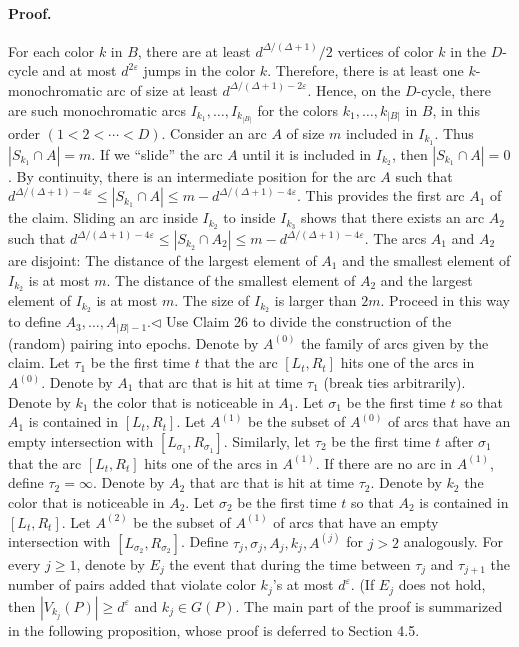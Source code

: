 \documentclass[10pt,a4paper]{article}
\begin{document}
\paragraph{Proof.} For each color $k$ in $B$, there are at least $d^{\Delta/(\Delta+1)}/2$ vertices of color $k$ in the $D$-cycle and at most $d^{2\varepsilon}$ jumps in the color $k$. Therefore, there is at least one $k$-monochromatic arc of size at least $d^{\Delta/(\Delta+1)-2\varepsilon}$. Hence, on the $D$-cycle, there are such monochromatic arcs $I_{k_1},\ldots,I_{k_{|B|}}$ for the colors $k_1,\ldots,k_{|B|}$ in $B$, in this order $(1<2<\cdots<D)$.
Consider an arc $A$ of size $m$ included in $I_{k_1}$. Thus $|S_{k_1}\cap A|=m$. If we ``slide'' the arc $A$ until it is included in $I_{k_2}$, then $|S_{k_1}\cap A|=0$. By continuity, there is an intermediate position for the arc $A$ such that $d^{\Delta/(\Delta+1)-4\varepsilon}\leq|S_{k_1}\cap A|\leq m-d^{\Delta/(\Delta+1)-4\varepsilon}$. This provides the first arc $A_1$ of the claim.
Sliding an arc inside $I_{k_2}$ to inside $I_{k_3}$ shows that there exists an arc $A_2$ such that $d^{\Delta/(\Delta+1)-4\varepsilon}\leq|S_{k_2}\cap A_2|\leq m-d^{\Delta/(\Delta+1)-4\varepsilon}$. The arcs $A_1$ and $A_2$ are disjoint: The distance of the largest element of $A_1$ and the smallest element of $I_{k_2}$ is at most $m$. The distance of the smallest element of $A_2$ and the largest element of $I_{k_2}$ is at most $m$. The size of $I_{k_2}$ is larger than $2m$. Proceed in this way to define $A_3,\ldots,A_{|B|-1}$.\hfill$\triangleleft$
Use Claim 26 to divide the construction of the (random) pairing into epochs. Denote by $A^{(0)}$ the family of arcs given by the claim. Let $\tau_1$ be the first time $t$ that the arc $[L_t,R_t]$ hits one of the arcs in $A^{(0)}$. Denote by $A_1$ that arc that is hit at time $\tau_1$ (break ties arbitrarily). Denote by $k_1$ the color that is noticeable in $A_1$. Let $\sigma_1$ be the first time $t$ so that $A_1$ is contained in $[L_t,R_t]$. Let $A^{(1)}$ be the subset of $A^{(0)}$ of arcs that have an empty intersection with $[L_{\sigma_1},R_{\sigma_1}]$. Similarly, let $\tau_2$ be the first time $t$ after $\sigma_1$ that the arc $[L_t,R_t]$ hits one of the arcs in $A^{(1)}$. If there are no arc in $A^{(1)}$, define $\tau_2=\infty$. Denote by $A_2$ that arc that is hit at time $\tau_2$. Denote by $k_2$ the color that is noticeable in $A_2$. Let $\sigma_2$ be the first time $t$ so that $A_2$ is contained in $[L_t,R_t]$. Let $A^{(2)}$ be the subset of $A^{(1)}$ of arcs that have an empty intersection with $[L_{\sigma_2},R_{\sigma_2}]$. Define $\tau_j,\sigma_j,A_j,k_j,A^{(j)}$ for $j>2$ analogously. For every $j\geq1$, denote by $E_j$ the event that during the time between $\tau_j$ and $\tau_{j+1}$ the number of pairs added that violate color $k_j$'s at most $d^\varepsilon$. (If $E_j$ does not hold, then $|V_{k_j}(P)|\geq d^\varepsilon$ and $k_j\in G(P)$. The main part of the proof is summarized in the following proposition, whose proof is deferred to Section 4.5.
\end{document}
